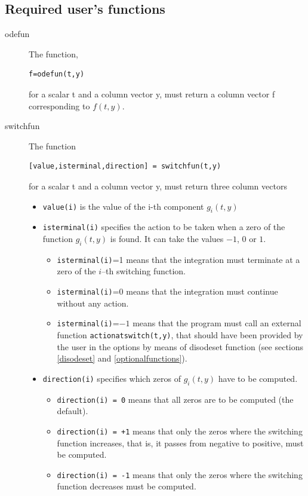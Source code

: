 \documentclass{article}
\begin{document}
\subsection{Required user's functions}
\begin{description}
\item[odefun]
The function,

\begin{verbatim}
f=odefun(t,y)
\end{verbatim}

\noindent for a scalar t and a column vector y, must return a column vector f corresponding to $f(t,y)$.
\item[switchfun]
The function

\begin{verbatim}
[value,isterminal,direction] = switchfun(t,y)
\end{verbatim}

\noindent for a scalar t and a column vector y, must return three column vectors
\begin{itemize}
\item
\texttt{value(i)}  is the value of the i-th component  $g_i(t,y)$
\item
\texttt{isterminal(i)} specifies the action to be taken when a zero of the function
$g_i(t,y)$ is found. It can take the values $-1$, $0$ or $1$.
\begin{itemize}
\item
\texttt{isterminal(i)}=1 means
that the integration must terminate at a zero of the $i$--th switching function.
\item
\texttt{isterminal(i)}=0 means that the integration must continue without any action.
\item
\texttt{isterminal(i)}=$-1$ means that the program must call an external function \texttt{actionatswitch(t,y)}, that should have been provided by the user in the options by means of disodeset function  (see sections \ref{disodeset}
and \ref{optionalfunctions}).
\end{itemize}
\item
\texttt{direction(i)} specifies which zeros of $g_i(t,y)$ have to be computed.
\begin{itemize}
\item
\texttt{direction(i) = 0} means  that all zeros are to be computed (the default).
\item
\texttt{direction(i) = +1} means that only the zeros where the switching function increases, that is,
it passes from negative to positive, must be computed.
\item
\texttt{direction(i) = -1}
means that only the zeros where the switching function decreases must be computed.
\end{itemize}
\end{itemize}
\end{description}
\end{document}
